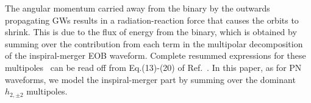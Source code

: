 \documentclass[aps,
prd,
twocolumn,
superscriptaddress,
lengthcheck,showpacs,letterpaper,nofootinbib,
floatfix]{revtex4-1}
\newcommand{\Sum}{\displaystyle\sum\limits}
\newcommand{\ii}{{\rm i}}
\newcommand{\D}{\mathrm{d}}
\newcommand{\real}{\mathrm{real}}
\begin{document}
The angular momentum carried away from the binary
by the outwards propagating GWs results in a radiation-reaction force
that causes the orbits to shrink.
This is due to the flux of energy from the binary, which
is obtained by summing over the contribution from each term in the multipolar
decomposition of the inspiral-merger EOB waveform.
Complete resummed expressions for these multipoles~\cite{DamourFluxhlm01} can be 
read off from Eq.(13)-(20) of Ref.~\cite{BuonannoEOBv2Main}. In this paper, 
as for PN waveforms, we model the inspiral-merger part 
by summing over the dominant $h_{2,\pm 2}$ multipoles.
\end{document}
